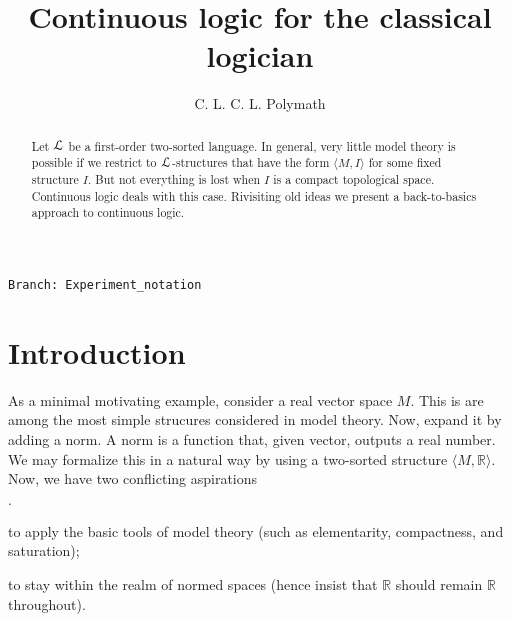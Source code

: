 \documentclass[10pt,oneside]{amsproc}
\author{C. L. C. L. Polymath}
\newcommand{\mylabel}[1]{{#1}\hfill}
\renewenvironment{itemize}
  {\begin{list}{$\cdot$}{%
  \setlength{\parskip}{0mm}
  \setlength{\topsep}{.4\baselineskip}
  \setlength{\rightmargin}{0mm}
  \setlength{\listparindent}{0mm}
  \setlength{\itemindent}{0mm}
  \setlength{\labelwidth}{3ex}
  \setlength{\itemsep}{.2\baselineskip}
  \setlength{\parsep}{.2\baselineskip}
  \setlength{\partopsep}{0mm}
  \setlength{\labelsep}{1ex}
  \setlength{\leftmargin}{\labelwidth+\labelsep}
  \let\makelabel\mylabel}}{%
\end{list}}
\begin{document}
\title{Continuous logic for the classical logician}
\hfill\texttt{Branch:\ Experiment\_notation\ \DTMnow}\bigskip
\maketitle
\raggedbottom

\def\forallH{\forall\raisebox{1.1ex}{\scaleto{\sf H}{.8ex}\kern-.2ex}}
\def\existsH{\exists\raisebox{1.1ex}{\scaleto{\sf H}{.8ex}\kern-.2ex}}
\def\forallI{\forall\raisebox{1.1ex}{\scaleto{\sf I}{.8ex}\kern-.2ex}}
\def\existsI{\exists\raisebox{1.1ex}{\scaleto{\sf I}{.8ex}\kern-.2ex}}

\newcommand\questionsign[1][2ex]{%
  \renewcommand\stacktype{L}%
  \scaleto{\stackon[-.6pt]{\color{red}$\triangle$}{\color{red}\bfseries\small ?}}{#1}%
}

\newcommand\dangersign[1][2ex]{%
  \renewcommand\stacktype{L}%
  \scaleto{\stackon[-.6pt]{\color{red}$\triangle$}{\color{red}\bfseries\small !}}{#1}%
}

\begin{abstract}
  Let ${\EuScript L}$ be a first-order two-sorted language.
  In general, very little model theory is possible if we restrict to ${\EuScript L}$-structures that have the form $\langle M,I\rangle$ for some fixed structure $I$.
  But not everything is lost when $I$ is a compact topological space.
  Continuous logic deals with this case.
  Rivisiting old ideas we present a back-to-basics approach to continuous logic.
\end{abstract}
\section{Introduction}\label{intro}


\def\ceq#1#2#3{\parbox[t]{23ex}{$\displaystyle #1$}\parbox{6ex}{\hfil $#2$}{$\displaystyle #3$}}

As a minimal motivating example, consider a real vector space $M$.
This is are among the most simple strucures considered in model theory.
Now, expand it by adding a norm.
A norm is a function that, given vector, outputs a real number.
We may formalize this in a natural way by using a two-sorted structure $\langle M,\mathds{R}\rangle$.
Now, we have two conflicting aspirations
\begin{itemize}
  \item[i.] to apply the basic tools of model theory (such as elementarity, compactness, and saturation);
  \item[ii.] to stay within the realm of normed spaces (hence insist that 
  $\mathds{R}$ should remain $\mathds{R}$ throughout).
\end{itemize}
\end{document}
